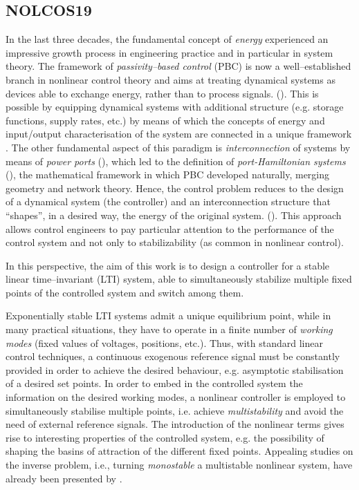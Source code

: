 {\color{blue}
\subsection{NOLCOS19}
In the last three decades, the fundamental concept of \textit{energy} experienced an impressive growth process in engineering practice and in particular in system theory. The framework of \textit{passivity--based control} (PBC) is now a well--established branch in nonlinear control theory and aims at treating dynamical systems as devices able to exchange energy, rather than to process signals. (\cite{ortega2001putting}). 
This is possible by equipping dynamical systems with additional structure (e.g. storage functions, supply rates, etc.) by means of which the concepts of energy and input/output characterisation of the system are connected in a unique framework \cite{sontag2008input}.
The other fundamental aspect of this paradigm is \textit{interconnection} of systems by means of \textit{power ports} (\cite{duindam2009modeling}), which led to the definition of \textit{port-Hamiltonian systems} (\cite{MASCHKE1992359,ortega2001putting,van2014port}), the mathematical framework in which PBC developed naturally, merging geometry and network theory. Hence, the control problem reduces to the design of a dynamical system (the controller) and an interconnection
structure that ``shapes'', in a desired way, the energy of the original system. (\cite{ortega2001putting,ortega2008control}). This approach allows control engineers to pay particular attention to the performance of the control system and not only to stabilizability (as common in nonlinear control). 

In this perspective, the aim of this work is to design a controller for a stable linear time--invariant (LTI) system, able to simultaneously stabilize multiple fixed points of the controlled system and switch among them.

Exponentially stable LTI systems admit a unique equilibrium point, while in many practical situations, they have to operate in a finite number of \textit{working modes} (fixed values of voltages, positions, etc.).
Thus, with standard linear control techniques, a continuous exogenous reference signal must be constantly provided in order to achieve the desired behaviour, e.g. asymptotic stabilisation of a desired set points.
%
In order to embed in the controlled system the information on the desired working modes, a nonlinear controller is employed to simultaneously stabilise multiple points, i.e. achieve \textit{multistability} and avoid the need of external reference signals.
The introduction of the nonlinear terms gives rise to interesting properties of the controlled system, e.g. the possibility of shaping the basins of attraction of the different fixed points.
Appealing studies on the inverse problem, i.e., turning \textit{monostable} a {multistable} nonlinear system, have already been presented by \cite{PISARCHIK2014167}.

}
